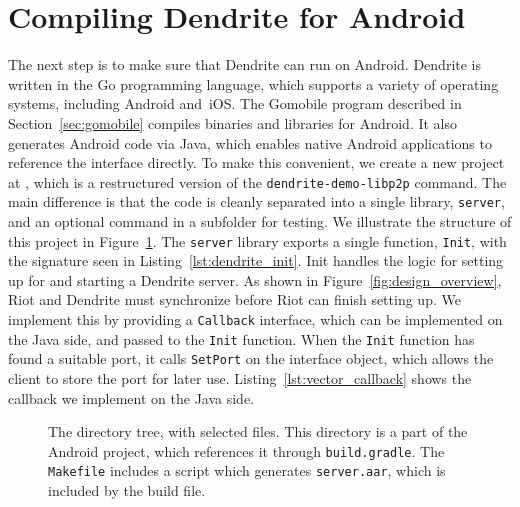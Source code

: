 \section{Compiling Dendrite for Android}
The next step is to make sure that Dendrite can run on Android.
Dendrite is written in the Go programming language, which supports a variety of operating systems, including Android and~iOS\@.
The Gomobile program described in Section~\ref{sec:gomobile} compiles binaries and libraries for Android.
It also generates Android code via Java, which enables native Android applications to reference the interface directly.
To make this convenient, we create a new project at , which is a restructured version of the \texttt{dendrite-demo-libp2p} command.
The main difference is that the code is cleanly separated into a single library, \texttt{server}, and an optional command in a subfolder for testing.
We illustrate the structure of this project in Figure~\ref{fig:dirtree_server}.
The \texttt{server} library exports a single function, \texttt{Init}, with the signature seen in Listing~\ref{lst:dendrite_init}.
Init handles the logic for setting up for and starting a Dendrite server.
As shown in Figure~\ref{fig:design_overview}, Riot and Dendrite must synchronize before Riot can finish setting up.
We implement this by providing a \texttt{Callback} interface, which can be implemented on the Java side, and passed to the \texttt{Init} function.
When the \texttt{Init} function has found a suitable port, it calls \texttt{SetPort} on the interface object, which allows the client to store the port for later use.
Listing~\ref{lst:vector_callback} shows the callback we implement on the Java side.

\begin{figure}
	\caption{%
		The  directory tree, with selected files.
		This directory is a part of the Android project, which references it through \texttt{build.gradle}.
		The \texttt{Makefile} includes a script which generates \texttt{server.aar}, which is included by the build file.
	}%
	\label{fig:dirtree_server}
\end{figure}

